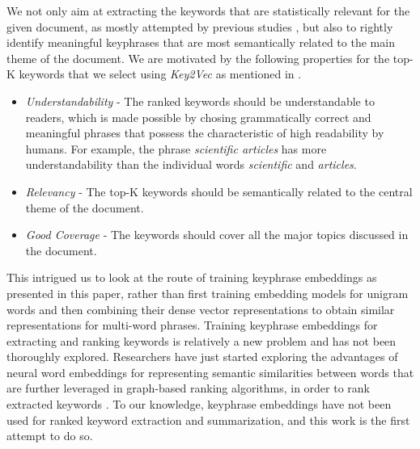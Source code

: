 \documentclass[11pt,a4paper]{article}
\begin{document}

We not only aim at extracting the keywords that are statistically relevant for the given document, as mostly attempted by previous studies \cite{hasan2014automatic}, but also to rightly identify meaningful keyphrases that are most semantically related to the main theme of the document. We are motivated by the following properties for the top-K keywords that we select using \textit{Key2Vec} as mentioned in \cite{liu2009clustering}.

\begin{itemize}
\item \textit{Understandability} - The ranked keywords should be understandable to readers, which is made possible by chosing grammatically correct and meaningful phrases that possess the characteristic of high readability by humans. For example, the phrase \textit{scientific articles} has more understandability than the individual words \textit{scientific} and \textit{articles}.  
\item \textit{Relevancy} - The top-K keywords should be semantically related to the central theme of the document.
\item \textit{Good Coverage} - The keywords should cover all the major topics discussed in the document.
\end{itemize}

This intrigued us to look at the route of training keyphrase embeddings as presented in this paper, rather than first training embedding models for unigram words and then combining their dense vector representations to obtain similar representations for multi-word phrases. Training keyphrase embeddings for extracting and ranking keywords is relatively a new problem and has not been thoroughly explored. Researchers have just started exploring the advantages of neural word embeddings for representing semantic similarities between words that are further leveraged in graph-based ranking algorithms, in order to rank extracted keywords \cite{wang2015using}. To our knowledge, keyphrase embeddings have not been used for ranked keyword extraction and summarization, and this work is the first attempt to do so. 
\end{document}
